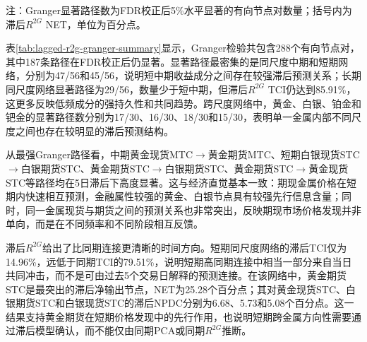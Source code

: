 \documentclass[UTF8,zihao=-4,fontset=fandol]{ctexart}
\newenvironment{normaltable}{%
  \begin{center}\songti\zihao{5}\setlength{\baselineskip}{12pt}\selectfont\renewcommand{\arraystretch}{1.0}%
}{\end{center}}
\begin{document}
\begin{table}[H]
\caption{Granger检验与滞后$R^{2G}$连接强度}
\label{tab:lagged-r2g-granger-summary}
\begin{normaltable}
\end{normaltable}
\begin{flushleft}
{\songti{}注：Granger显著路径数为FDR校正后5\%水平显著的有向节点对数量；括号内为滞后$R^{2G}$ NET，单位为百分点。}
\end{flushleft}
\end{table}

表\ref{tab:lagged-r2g-granger-summary}显示，Granger检验共包含288个有向节点对，其中187条路径在FDR校正后仍显著。显著路径最密集的是同尺度中期和短期网络，分别为47/56和45/56，说明短中期收益成分之间存在较强滞后预测关系；长期同尺度网络显著路径为29/56，数量少于短中期，但滞后$R^{2G}$ TCI仍达到85.91\%，这更多反映低频成分的强持久性和共同趋势。跨尺度网络中，黄金、白银、铂金和钯金的显著路径数分别为17/30、16/30、18/30和15/30，表明单一金属内部不同尺度之间也存在较明显的滞后预测结构。

从最强Granger路径看，中期黄金现货MTC$\rightarrow$黄金期货MTC、短期白银现货STC$\rightarrow$白银期货STC、黄金期货STC$\rightarrow$白银期货STC、黄金期货STC$\rightarrow$黄金现货STC等路径均在5日滞后下高度显著。这与经济直觉基本一致：期现金属价格在短期内快速相互预测，金融属性较强的黄金、白银节点具有较强先行信息含量；同时，同一金属现货与期货之间的预测关系也非常突出，反映期现市场价格发现并非单向，而是在不同频率和不同阶段相互反馈。

滞后$R^{2G}$给出了比同期连接更清晰的时间方向。短期同尺度网络的滞后TCI仅为14.96\%，远低于同期TCI的79.51\%，说明短期高同期连接中相当一部分来自当日共同冲击，而不是可由过去5个交易日解释的预测连接。在该网络中，黄金期货STC是最突出的滞后净输出节点，NET为25.28个百分点；其对黄金现货STC、白银期货STC和白银现货STC的滞后NPDC分别为6.68、5.73和5.08个百分点。这一结果支持黄金期货在短期价格发现中的先行作用，也说明短期跨金属方向性需要通过滞后模型确认，而不能仅由同期PCA或同期$R^{2G}$推断。
\end{document}
